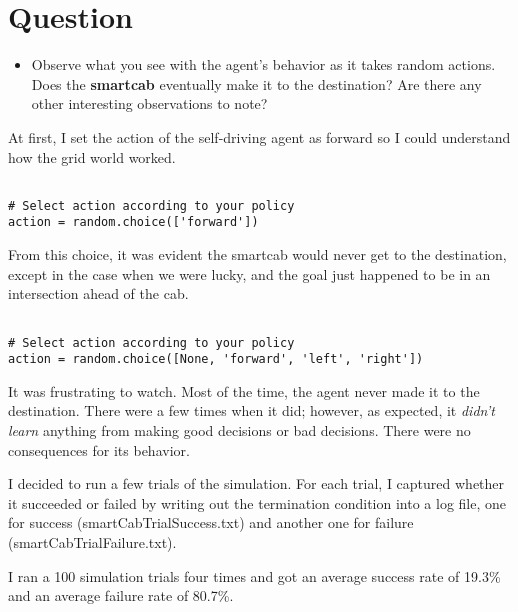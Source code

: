\documentclass[twoside,openright,titlepage,numbers=noenddot,headinclude,%
               footinclude=true,cleardoublepage=empty,abstractoff,BCOR=5mm,%
               paper=a4,fontsize=11pt,ngerman,american]{scrreprt}
\numberwithin{theorem}{chapter}
\numberwithin{definition}{chapter}
\numberwithin{algorithm}{chapter}
\numberwithin{figure}{chapter}
\numberwithin{table}{chapter}
\numberwithin{equation}{chapter}
\begin{document}
\section*{Question}

\begin{itemize}
\item Observe what you see with the agent's behavior as it takes random actions. Does the \textbf{smartcab} eventually make it to the destination? Are there any other interesting observations to note?
\end{itemize}




 


At first, I set the action of the self-driving agent as forward so I could understand how the grid world worked. 
\begin{verbatim}

# Select action according to your policy
action = random.choice(['forward'])

\end{verbatim}

From this choice, it was evident the smartcab would never get to the destination, except in the case when we were lucky, and the goal just happened to be in an intersection ahead of the cab.
\begin{verbatim}

# Select action according to your policy
action = random.choice([None, 'forward', 'left', 'right'])

\end{verbatim}

It was frustrating to watch. Most of the time, the agent never made it to the destination. There were a few times when it did; however, as expected, it \emph{didn't learn} anything from making good decisions or bad decisions. There were no consequences for its behavior.  

I decided to run a few trials of the simulation. For each trial, I captured whether it succeeded or failed by writing out the termination condition into a log file, one for success (smartCabTrialSuccess.txt) and another one for failure (smartCabTrialFailure.txt).

I ran a 100 simulation trials four times and got an average success rate of 19.3\% and an average failure rate of 80.7\%.




%
%
\end{document}
